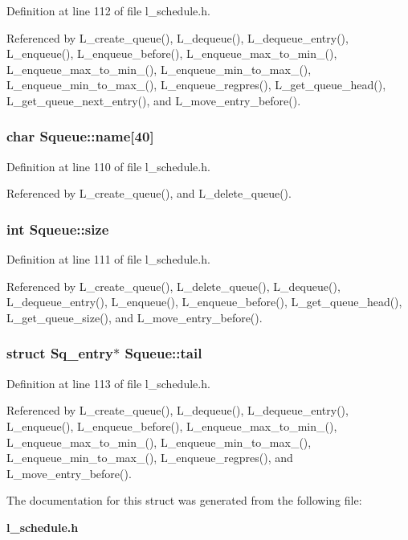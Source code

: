 Definition at line 112 of file l\_\-schedule.h.

Referenced by L\_\-create\_\-queue(), L\_\-dequeue(), L\_\-dequeue\_\-entry(), L\_\-enqueue(), L\_\-enqueue\_\-before(), L\_\-enqueue\_\-max\_\-to\_\-min\_(), L\_\-enqueue\_\-max\_\-to\_\-min\_(), L\_\-enqueue\_\-min\_\-to\_\-max\_(), L\_\-enqueue\_\-min\_\-to\_\-max\_(), L\_\-enqueue\_\-regpres(), L\_\-get\_\-queue\_\-head(), L\_\-get\_\-queue\_\-next\_\-entry(), and L\_\-move\_\-entry\_\-before().
\subsubsection{\setlength{\rightskip}{0pt plus 5cm}char \bf{Squeue::name}[40]}\label{structSqueue_52c5171f9689ba39176d5e4faf49735f}




Definition at line 110 of file l\_\-schedule.h.

Referenced by L\_\-create\_\-queue(), and L\_\-delete\_\-queue().
\subsubsection{\setlength{\rightskip}{0pt plus 5cm}int \bf{Squeue::size}}\label{structSqueue_166b421ff449a1e6ad7fb5195ca3001e}




Definition at line 111 of file l\_\-schedule.h.

Referenced by L\_\-create\_\-queue(), L\_\-delete\_\-queue(), L\_\-dequeue(), L\_\-dequeue\_\-entry(), L\_\-enqueue(), L\_\-enqueue\_\-before(), L\_\-get\_\-queue\_\-head(), L\_\-get\_\-queue\_\-size(), and L\_\-move\_\-entry\_\-before().
\subsubsection{\setlength{\rightskip}{0pt plus 5cm}struct \bf{Sq\_\-entry}$\ast$ \bf{Squeue::tail}}\label{structSqueue_cdc1f8d33a5bc5f0313b44d5a02d3fa4}




Definition at line 113 of file l\_\-schedule.h.

Referenced by L\_\-create\_\-queue(), L\_\-dequeue(), L\_\-dequeue\_\-entry(), L\_\-enqueue(), L\_\-enqueue\_\-before(), L\_\-enqueue\_\-max\_\-to\_\-min\_(), L\_\-enqueue\_\-max\_\-to\_\-min\_(), L\_\-enqueue\_\-min\_\-to\_\-max\_(), L\_\-enqueue\_\-min\_\-to\_\-max\_(), L\_\-enqueue\_\-regpres(), and L\_\-move\_\-entry\_\-before().

The documentation for this struct was generated from the following file:\begin{CompactItemize}
\item 
\bf{l\_\-schedule.h}\end{CompactItemize}
